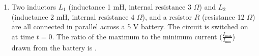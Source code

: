 
\begin{enumerate}
    \item Two inductors $L_1$ (inductance 1 mH, internal resistance 3 $\Omega$) and $L_2$ (inductance 2 mH, internal resistance 4 $\Omega$), and a resistor $R$ (resistance 12 $\Omega$) are all connected in parallel across a 5 V battery. The circuit is switched on at time $t = 0$. The ratio of the maximum to the minimum current ($\frac{I_{\text{max}}}{I_{\text{min}}}$) drawn from the battery is \underline{\hspace{2.5 cm}}.
\end{enumerate}
